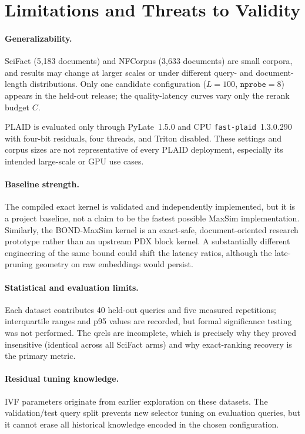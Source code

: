 \section{Limitations and Threats to Validity}
\label{sec:limitations}

\paragraph{Generalizability.}
SciFact (5{,}183 documents) and NFCorpus (3{,}633 documents) are
small corpora, and results may change at larger scales or under different
query- and document-length distributions. Only one candidate configuration
($L = 100$, $\texttt{nprobe} = 8$) appears in the held-out release; the
quality-latency curves vary only the rerank budget $C$.

PLAID is evaluated only through PyLate~1.5.0 and CPU
\texttt{fast-plaid}~1.3.0.290 with four-bit residuals, four threads, and
Triton disabled. These settings and corpus sizes are not representative of
every PLAID deployment, especially its intended large-scale or GPU use cases.

\paragraph{Baseline strength.}
The compiled exact kernel is validated and independently implemented, but it
is a project baseline, not a claim to be the fastest possible MaxSim
implementation. Similarly, the BOND-MaxSim kernel is an exact-safe,
document-oriented research prototype rather than an upstream PDX block kernel.
A substantially different engineering of the same bound could shift the
latency ratios, although the late-pruning geometry on raw embeddings would
persist.

\paragraph{Statistical and evaluation limits.}
Each dataset contributes 40 held-out queries and five measured repetitions;
interquartile ranges and p95 values are recorded, but formal significance
testing was not performed. The qrels are incomplete, which is precisely why
they proved insensitive (identical across all SciFact arms) and why
exact-ranking recovery is the primary metric.

\paragraph{Residual tuning knowledge.}
IVF parameters originate from earlier exploration on these datasets. The
validation/test query split prevents new selector tuning on evaluation
queries, but it cannot erase all historical knowledge encoded in the chosen
configuration.

